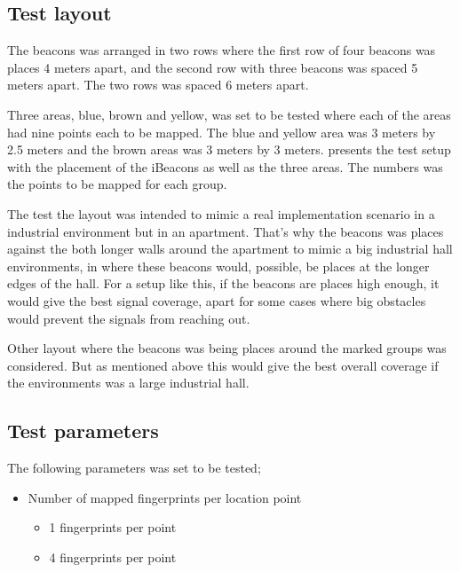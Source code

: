 

\subsection{Test layout}\label{sec:methodTestLayout}

The beacons was arranged in two rows where the first row of four beacons was places 4 meters apart, and the second row with three beacons was spaced 5 meters apart.
The two rows was spaced 6 meters apart.

\bigskip

Three areas, blue, brown and yellow, was set to be tested where each of the areas had nine points each to be mapped.
The blue and yellow area was 3 meters by 2.5 meters and the brown areas was 3 meters by 3 meters.
 presents the test setup with the placement of the iBeacons as well as the three areas.
The numbers was the points to be mapped for each group.

\bigskip

The test the layout was intended to mimic a real implementation scenario in a industrial environment but in an apartment.
That's why the beacons was places against the both longer walls around the apartment to mimic a big industrial hall environments, in where these beacons would, possible, be places at the longer edges of the hall.
For a setup like this, if the beacons are places high enough, it would give the best signal coverage, apart for some cases where big obstacles would prevent the signals from reaching out.

\bigskip

Other layout where the beacons was being places around the marked groups was considered.
But as mentioned above this would give the best overall coverage if the environments was a large industrial hall.


\subsection{Test parameters}\label{sec:methodTestParameters}
The following parameters was set to be tested;

\begin{itemize}
\item Number of mapped fingerprints per location point
	\begin{itemize}
		\item 1 fingerprints per point
		\item 4 fingerprints per point
	\end{itemize}
\end{itemize}

